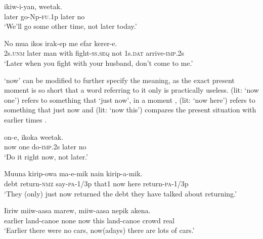 \ea%
\label{ex:3:x476}
\gll {} ikiw-i-yan,  weetak. \\
later go-Np-\textsc{fu}.1p later no\\
\glt`We'll go some other time, not later today.'
\z

\ea%
\label{ex:3:x477}
\gll No  mua ikos irak-ep me efar kerer-e. \\
2s.\textsc{unm} later man with fight-\textsc{ss}.\textsc{seq} not 1s.\textsc{dat} arrive-\textsc{imp}.2s\\
\glt`Later when you fight with your husband, don't come to me.'
\z

 `now' can be modified to further specify the meaning, as the exact present moment is so short that a word referring to it only is practically useless.  (lit: `now one') refers to something that  `just now', in a moment ,  (lit: `now here') refers to something that  just now  and  (lit: `now this') compares the present situation with earlier times .

\ea%
\label{ex:3:x478}
\gll {}  on-e, ikoka weetak. \\
now one do-\textsc{imp}.2s later no\\
\glt`Do it right now, not later.'
\z

\ea%
\label{ex:3:x479}
\gll Muuna kirip-owa ma-e-mik nain   kirip-a-mik. \\
debt return-\textsc{nmz} say-\textsc{pa}-1/3p that1 now here return-\textsc{pa}-1/3p\\
\glt`They (only) just now returned the debt they have talked about returning.'
\z

\ea%
\label{ex:3:x480}
\gll Iiriw miiw-aasa marew,   miiw-aasa nepik akena. \\
earlier land-canoe none now this land-canoe crowd real\\
\glt`Earlier there were no cars, now(adays) there are lots of cars.'
\z

